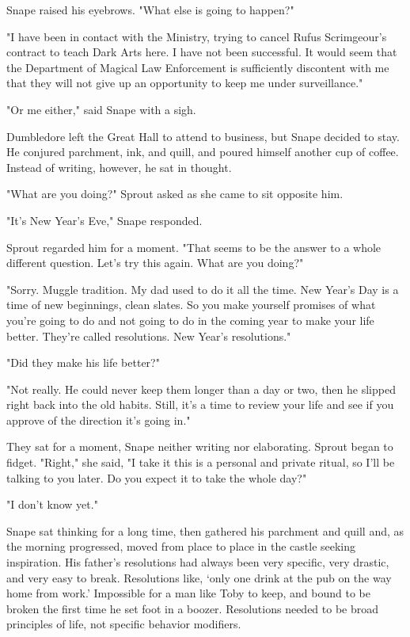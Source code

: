 \documentclass[a4paper,11pt]{article}
\begin{document}
Snape raised his eyebrows. "What else is going to happen?"

"I have been in contact with the Ministry, trying to cancel Rufus Scrimgeour's contract to teach Dark Arts here. I have not been successful. It would seem that the Department of Magical Law Enforcement is sufficiently discontent with me that they will not give up an opportunity to keep me under surveillance."

"Or me either," said Snape with a sigh.

Dumbledore left the Great Hall to attend to business, but Snape decided to stay. He conjured parchment, ink, and quill, and poured himself another cup of coffee. Instead of writing, however, he sat in thought.

"What are you doing?" Sprout asked as she came to sit opposite him.

"It's New Year's Eve," Snape responded.

Sprout regarded him for a moment. "That seems to be the answer to a whole different question. Let's try this again. What are you doing?"

"Sorry. Muggle tradition. My dad used to do it all the time. New Year's Day is a time of new beginnings, clean slates. So you make yourself promises of what you're going to do and not going to do in the coming year to make your life better. They're called resolutions. New Year's resolutions."

"Did they make his life better?"

"Not really. He could never keep them longer than a day or two, then he slipped right back into the old habits. Still, it's a time to review your life and see if you approve of the direction it's going in."

They sat for a moment, Snape neither writing nor elaborating. Sprout began to fidget. "Right," she said, "I take it this is a personal and private ritual, so I'll be talking to you later. Do you expect it to take the whole day?"

"I don't know yet."

Snape sat thinking for a long time, then gathered his parchment and quill and, as the morning progressed, moved from place to place in the castle seeking inspiration. His father's resolutions had always been very specific, very drastic, and very easy to break. Resolutions like, `only one drink at the pub on the way home from work.' Impossible for a man like Toby to keep, and bound to be broken the first time he set foot in a boozer. Resolutions needed to be broad principles of life, not specific behavior modifiers.
\end{document}
